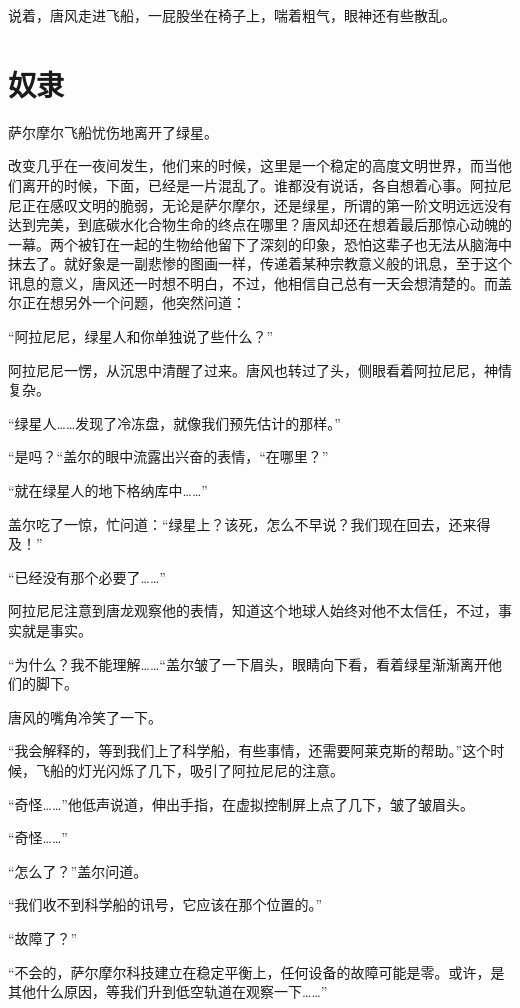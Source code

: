 说着，唐风走进飞船，一屁股坐在椅子上，喘着粗气，眼神还有些散乱。

\chapter{奴隶}

萨尔摩尔飞船忧伤地离开了绿星。 

改变几乎在一夜间发生，他们来的时候，这里是一个稳定的高度文明世界，而当他们离开的时候，下面，已经是一片混乱了。谁都没有说话，各自想着心事。阿拉尼尼正在感叹文明的脆弱，无论是萨尔摩尔，还是绿星，所谓的第一阶文明远远没有达到完美，到底碳水化合物生命的终点在哪里？唐风却还在想着最后那惊心动魄的一幕。两个被钉在一起的生物给他留下了深刻的印象，恐怕这辈子也无法从脑海中抹去了。就好象是一副悲惨的图画一样，传递着某种宗教意义般的讯息，至于这个讯息的意义，唐风还一时想不明白，不过，他相信自己总有一天会想清楚的。而盖尔正在想另外一个问题，他突然问道： 

“阿拉尼尼，绿星人和你单独说了些什么？” 

阿拉尼尼一愣，从沉思中清醒了过来。唐风也转过了头，侧眼看着阿拉尼尼，神情复杂。 

“绿星人……发现了冷冻盘，就像我们预先估计的那样。” 

“是吗？“盖尔的眼中流露出兴奋的表情，“在哪里？” 

“就在绿星人的地下格纳库中……” 

盖尔吃了一惊，忙问道：“绿星上？该死，怎么不早说？我们现在回去，还来得及！” 

“已经没有那个必要了……” 

阿拉尼尼注意到唐龙观察他的表情，知道这个地球人始终对他不太信任，不过，事实就是事实。 

“为什么？我不能理解……“盖尔皱了一下眉头，眼睛向下看，看着绿星渐渐离开他们的脚下。 

唐风的嘴角冷笑了一下。 

“我会解释的，等到我们上了科学船，有些事情，还需要阿莱克斯的帮助。”这个时候，飞船的灯光闪烁了几下，吸引了阿拉尼尼的注意。 

“奇怪……”他低声说道，伸出手指，在虚拟控制屏上点了几下，皱了皱眉头。 

“奇怪……” 

“怎么了？”盖尔问道。 

“我们收不到科学船的讯号，它应该在那个位置的。” 

“故障了？” 

“不会的，萨尔摩尔科技建立在稳定平衡上，任何设备的故障可能是零。或许，是其他什么原因，等我们升到低空轨道在观察一下……” 

